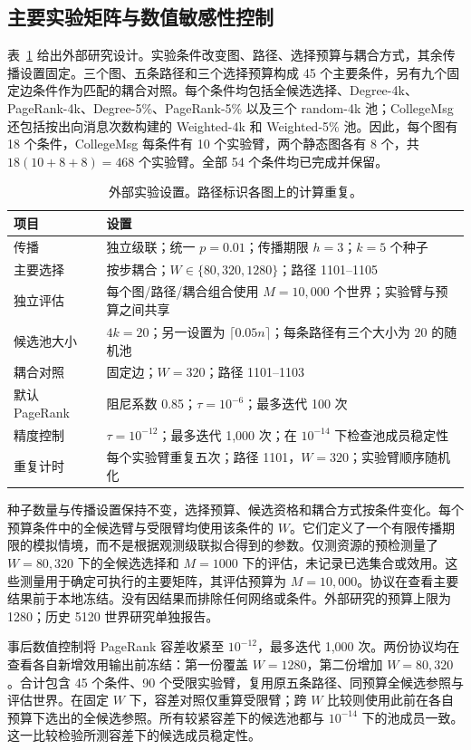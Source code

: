 \documentclass[smallextended]{svjour3}
\begin{document}
\subsection{主要实验矩阵与数值敏感性控制}
表~\ref{tab:settings} 给出外部研究设计。实验条件改变图、路径、选择预算与耦合方式，其余传播设置固定。三个图、五条路径和三个选择预算构成 45 个主要条件，另有九个固定边条件作为匹配的耦合对照。每个条件均包括全候选选择、Degree-4k、PageRank-4k、Degree-5\%、PageRank-5\% 以及三个 random-4k 池；CollegeMsg 还包括按出向消息次数构建的 Weighted-4k 和 Weighted-5\% 池。因此，每个图有 18 个条件，CollegeMsg 每条件有 10 个实验臂，两个静态图各有 8 个，共 $18(10+8+8)=468$ 个实验臂。全部 54 个条件均已完成并保留。

\begin{table}[htbp]
\caption{外部实验设置。路径标识各图上的计算重复。}\label{tab:settings}
\begin{tabularx}{\linewidth}{lX}
\toprule
项目 & 设置 \\
\midrule
传播 & 独立级联；统一 $p=0.01$；传播期限 $h=3$；$k=5$ 个种子 \\
主要选择 & 按步耦合；$W\in\{80,320,1280\}$；路径 1101--1105 \\
独立评估 & 每个图/路径/耦合组合使用 $M=10,000$ 个世界；实验臂与预算之间共享 \\
候选池大小 & $4k=20$；另一设置为 $\lceil0.05n\rceil$；每条路径有三个大小为 20 的随机池 \\
耦合对照 & 固定边；$W=320$；路径 1101--1103 \\
默认 PageRank & 阻尼系数 0.85；$\tau=10^{-6}$；最多迭代 100 次 \\
精度控制 & $\tau=10^{-12}$；最多迭代 1,000 次；在 $10^{-14}$ 下检查池成员稳定性 \\
重复计时 & 每个实验臂重复五次；路径 1101，$W=320$；实验臂顺序随机化 \\
\bottomrule
\end{tabularx}
\end{table}

种子数量与传播设置保持不变，选择预算、候选资格和耦合方式按条件变化。每个预算条件中的全候选臂与受限臂均使用该条件的 $W$。它们定义了一个有限传播期限的模拟情境，而不是根据观测级联拟合得到的参数。仅测资源的预检测量了 $W=80,320$ 下的全候选选择和 $M=1000$ 下的评估，未记录已选集合或效用。这些测量用于确定可执行的主要矩阵，其评估预算为 $M=10,000$。协议在查看主要结果前于本地冻结。没有因结果而排除任何网络或条件。外部研究的预算上限为 1280；历史 5120 世界研究单独报告。

事后数值控制将 PageRank 容差收紧至 $10^{-12}$，最多迭代 1,000 次。两份协议均在查看各自新增效用输出前冻结：第一份覆盖 $W=1280$，第二份增加 $W=80,320$。合计包含 45 个条件、90 个受限实验臂，复用原五条路径、同预算全候选参照与评估世界。在固定 $W$ 下，容差对照仅重算受限臂；跨 $W$ 比较则使用此前在各自预算下选出的全候选参照。所有较紧容差下的候选池都与 $10^{-14}$ 下的池成员一致。这一比较检验所测容差下的候选成员稳定性。
\end{document}
